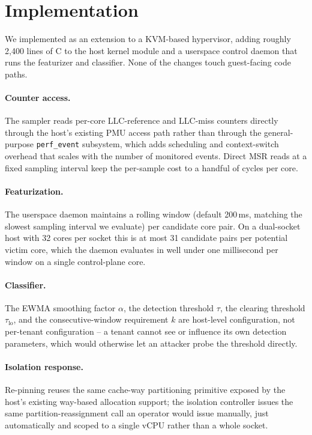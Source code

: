 \section{Implementation}
\label{sec:implementation}

We implemented \sysname{} as an extension to a KVM-based hypervisor, adding roughly 2,400
lines of C to the host kernel module and a userspace control daemon that runs the featurizer
and classifier. None of the changes touch guest-facing code paths.

\paragraph{Counter access.} The sampler reads per-core LLC-reference and LLC-miss counters
directly through the host's existing PMU access path rather than through the general-purpose
\texttt{perf\_event} subsystem, which adds scheduling and context-switch overhead that scales
with the number of monitored events. Direct MSR reads at a fixed sampling interval keep the
per-sample cost to a handful of cycles per core.

\paragraph{Featurization.} The userspace daemon maintains a rolling window (default 200\,ms,
matching the slowest sampling interval we evaluate) per candidate core pair. On a
dual-socket host with 32 cores per socket this is at most 31 candidate pairs per potential
victim core, which the daemon evaluates in well under one millisecond per window on a single
control-plane core.

\paragraph{Classifier.} The EWMA smoothing factor $\alpha$, the detection threshold $\tau$,
the clearing threshold $\tau_{\text{lo}}$, and the consecutive-window requirement $k$ are
host-level configuration, not per-tenant configuration -- a tenant cannot see or influence its
own detection parameters, which would otherwise let an attacker probe the threshold directly.

\paragraph{Isolation response.} Re-pinning reuses the same cache-way partitioning primitive
exposed by the host's existing way-based allocation support; the isolation controller issues
the same partition-reassignment call an operator would issue manually, just automatically and
scoped to a single vCPU rather than a whole socket.

